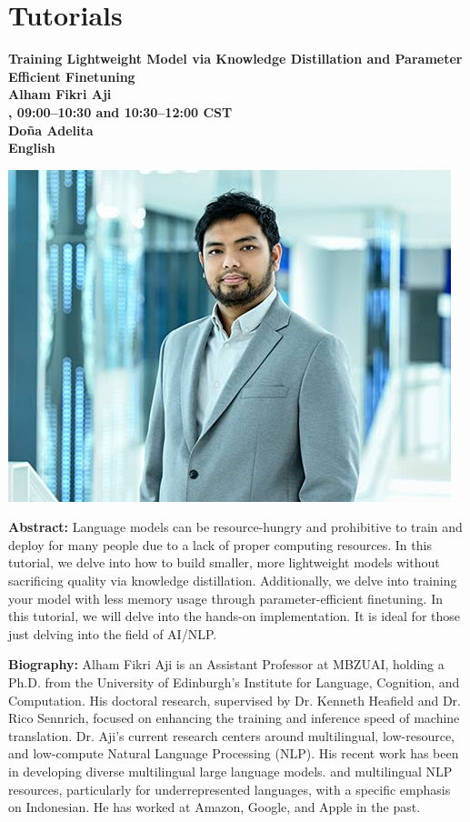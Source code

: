\newpage
{}
\section{Tutorials}

\begin{center}
{\bfseries\Large Training Lightweight Model via Knowledge Distillation and Parameter Efficient Finetuning} \\
\vspace{1.0em}
{\large\bf Alham Fikri Aji} \\

\textbf{\daydateyear{}, 09:00--10:30 and 10:30--12:00 CST}\\
\textbf{Do\~na Adelita}\\
\textbf{English}
\end{center}

\begin{center}
\includegraphics[width=0.4\linewidth]{content/mexican_nlp/alham.jpeg}
\end{center}

{\bfseries Abstract:}
Language models can be resource-hungry and prohibitive to train and deploy for many people due to a lack of proper computing resources. In this tutorial, we delve into how to build smaller, more lightweight models without sacrificing quality via knowledge distillation. Additionally, we delve into training your model with less memory usage through parameter-efficient finetuning. In this tutorial, we will delve into the hands-on implementation. It is ideal for those just delving into the field of AI/NLP.

{\bfseries Biography:}
Alham Fikri Aji is an Assistant Professor at MBZUAI, holding a Ph.D. from the University of Edinburgh's Institute for Language, Cognition, and Computation. His doctoral research, supervised by Dr. Kenneth Heafield and Dr. Rico Sennrich, focused on enhancing the training and inference speed of machine translation. Dr. Aji's current research centers around multilingual, low-resource, and low-compute Natural Language Processing (NLP). His recent work has been in developing diverse multilingual large language models. and multilingual NLP resources, particularly for underrepresented languages, with a specific emphasis on Indonesian. He has worked at Amazon, Google, and Apple in the past.

